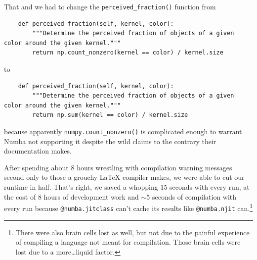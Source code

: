 \documentclass[12pt]{article}
\begin{document}
That and we had to change the \texttt{perceived_fraction()} function from
\begin{verbatim}
    def perceived_fraction(self, kernel, color):
        """Determine the perceived fraction of objects of a given color around the given kernel."""
        return np.count_nonzero(kernel == color) / kernel.size
\end{verbatim}
to
\begin{verbatim}
    def perceived_fraction(self, kernel, color):
        """Determine the perceived fraction of objects of a given color around the given kernel."""
        return np.sum(kernel == color) / kernel.size
\end{verbatim}
because apparently \texttt{numpy.count_nonzero()} is complicated enough to warrant Numba not supporting it despite the wild claims to the contrary their documentation makes.

After spending about 8 hours wrestling with compilation warning messages second only to those a grouchy \LaTeX{} compiler makes, we were able to cut our runtime in half.
That's right, we saved a whopping 15 seconds with every run, at the cost of 8 hours of development work and $\sim 5$ seconds of compilation with every run because \texttt{@numba.jitclass} can't cache its results like \texttt{@numba.njit} can.\footnote{There were also brain cells lost as well, but not due to the painful experience of compiling a language not meant for compilation. Those brain cells were lost due to a more\dots liquid factor.}
\end{document}
